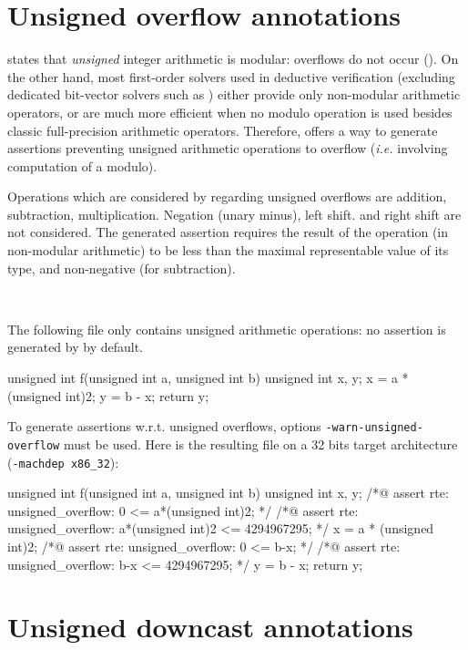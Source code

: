 \section{Unsigned overflow annotations}

\cnn{} states that {\it unsigned} integer arithmetic is modular: overflows do
not occur ().  On the other hand, most
first-order solvers used in deductive verification (excluding dedicated
bit-vector solvers such as \cite{Boolector}) either provide only non-modular
arithmetic operators, or are much more efficient when no modulo operation is
used besides classic full-precision arithmetic operators. Therefore, \rte{}
offers a way to generate assertions preventing unsigned arithmetic operations to
overflow ({\it i.e.} involving computation of a modulo).

Operations which are considered by \rte{} regarding unsigned overflows are
addition, subtraction, multiplication. Negation (unary minus), left shift.
and right shift are not considered. The generated assertion requires the result
of the operation (in non-modular arithmetic) to be less than the maximal
representable value of its type, and non-negative (for subtraction).

\begin{example} ~

The following file only contains unsigned arithmetic operations: no assertion is
generated by \rte{} by default.
\begin{listing-nonumber}
unsigned int f(unsigned int a, unsigned int b) {
  unsigned int x, y;
  x = a * (unsigned int)2;
  y = b - x;
  return y;
}
\end{listing-nonumber}

To generate assertions w.r.t. unsigned overflows, options
\lstinline|-warn-unsigned-overflow| must be used. Here is the resulting
file on a 32 bits target architecture (\lstinline|-machdep x86_32|):
\begin{listing-nonumber}
unsigned int f(unsigned int a, unsigned int b) {
  unsigned int x, y;
  /*@ assert rte: unsigned_overflow: 0 <= a*(unsigned int)2; */
  /*@ assert rte: unsigned_overflow: a*(unsigned int)2 <= 4294967295; */
  x = a * (unsigned int)2;
  /*@ assert rte: unsigned_overflow: 0 <= b-x; */
  /*@ assert rte: unsigned_overflow: b-x <= 4294967295; */
  y = b - x;
  return y;
}
\end{listing-nonumber}
\end{example}

\section{Unsigned downcast annotations}

